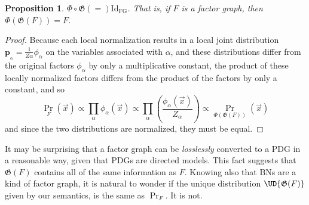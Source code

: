 \documentclass{article}
\theoremstyle{plain}
\newtheorem{prop}[theorem]{Proposition}
\theoremstyle{definition}
\theoremstyle{remark}
\newcommand\mat[1]{\mathbf{#1}}
\newcommand{\bp}[1][L]{\mat{p}_{\!_{#1}\!}}
\newcommand{\dg}[1]{\mathfrak{#1}}
\newcommand{\PDGof}[1]{\dg G(#1)}
\numberwithin{equation}{section}
\begin{document}
{	\begin{prop}\label{prop:fg-pdg-lossless}
		$\Phi \circ \PDGof = \mathrm{Id}_{\text{FG}}$. That is, if $F$ is a factor graph, then $\Phi(\PDGof{F}) = F$.
	\end{prop}
	\begin{proof}
		Because each local normalization results in a local joint
				distribution $\bp[\alpha] = \frac{1}{Z\alpha}
				\phi_\alpha$ on the variables associated with $\alpha$, and these distributions differ from the original factors $\phi_\alpha$ by only a multiplicative 
			   constant, the product of these locally normalized factors differs from the product of the factors by only a constant, and so 
		\[ \Pr_F(\vec x) \propto \prod_\alpha \phi_\alpha(\vec x) \propto \prod_\alpha \left(\frac{\phi_\alpha(\vec x)}{Z_\alpha}\right) \propto \Pr_{\Phi(\PDGof{F})}(\vec x) \]
		and since the two distributions are normalized, they must be equal.
	\end{proof}


	It may be surprising that a factor graph can be \emph{losslessly} converted to a PDG in a reasonable way, given that PDGs are directed models.
	This fact suggests that $\PDGof{F}$ contains all of the same information as $F$. Knowing also that BNs are a kind of factor graph, it is natural to wonder if the unique distribution $\UD{\PDGof{F}}$ given by our semantics, is the same as $\Pr_F$.		
		It is not. 


		
}
\end{document}
